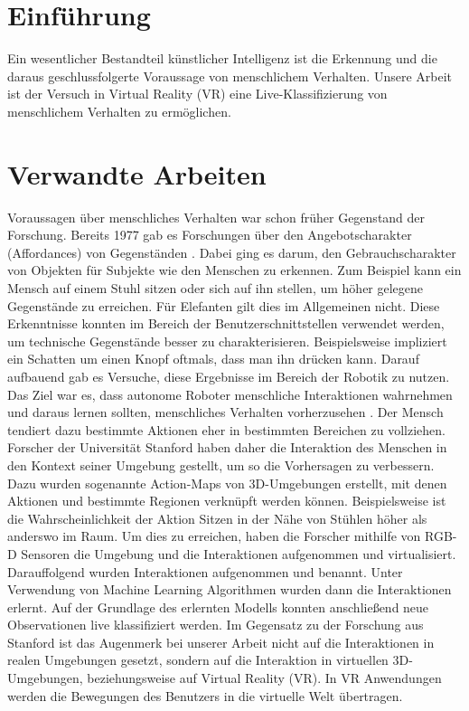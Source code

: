 
\section{Einführung}

Ein wesentlicher Bestandteil künstlicher Intelligenz ist die Erkennung und die daraus geschlussfolgerte Voraussage von menschlichem Verhalten. Unsere Arbeit ist der Versuch in Virtual Reality (VR) eine Live-Klassifizierung von menschlichem Verhalten zu ermöglichen.


\section{Verwandte Arbeiten}
Voraussagen über menschliches Verhalten war schon früher Gegenstand der Forschung. Bereits 1977 gab es Forschungen über den Angebotscharakter (Affordances) von Gegenständen \cite{gibson}. Dabei ging es darum, den Gebrauchscharakter von Objekten für Subjekte wie den Menschen zu erkennen. Zum Beispiel kann ein Mensch auf einem Stuhl sitzen oder sich auf ihn stellen, um höher gelegene Gegenstände zu erreichen. Für Elefanten gilt dies im Allgemeinen nicht. Diese Erkenntnisse konnten im Bereich der Benutzerschnittstellen verwendet werden, um technische Gegenstände besser zu charakterisieren. Beispielsweise impliziert ein Schatten um einen Knopf oftmals, dass man ihn drücken kann.
\newline
Darauf aufbauend gab es Versuche, diese Ergebnisse im Bereich der Robotik zu nutzen. Das Ziel war es, dass autonome Roboter menschliche Interaktionen wahrnehmen und daraus lernen sollten, menschliches Verhalten vorherzusehen \cite{fritz, montesano,stark, sun}.
\newline
Der Mensch tendiert dazu bestimmte Aktionen eher in bestimmten Bereichen zu vollziehen. Forscher der Universität Stanford haben daher
die Interaktion des Menschen in den Kontext seiner Umgebung gestellt, um so die Vorhersagen zu verbessern. Dazu wurden sogenannte
Action-Maps von 3D-Umgebungen erstellt, mit denen Aktionen und bestimmte Regionen verknüpft werden können. Beispielsweise ist
die Wahrscheinlichkeit der Aktion \glqq{}Sitzen\grqq{} in der Nähe von Stühlen höher als anderswo im Raum. Um dies zu erreichen, haben die Forscher mithilfe von RGB-D Sensoren die Umgebung und die Interaktionen aufgenommen und virtualisiert. Darauffolgend wurden Interaktionen aufgenommen und benannt. Unter Verwendung von Machine Learning Algorithmen wurden dann die Interaktionen erlernt. Auf der Grundlage des erlernten Modells konnten anschließend neue Observationen live klassifiziert werden.
\newline
Im Gegensatz zu der Forschung aus Stanford ist das Augenmerk bei unserer Arbeit nicht auf die Interaktionen in realen Umgebungen gesetzt, sondern auf die Interaktion in virtuellen 3D-Umgebungen, beziehungsweise auf Virtual Reality (VR). In VR Anwendungen werden die Bewegungen des Benutzers in die virtuelle Welt übertragen.



